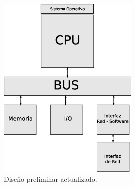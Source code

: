 \begin{figure}[H]
  \centering
	\includegraphics[width=0.60\textwidth]{2-sistema/graf/general2.eps}
  \caption{Diseño preliminar actualizado.}
  \label{fig:diseno2}
\end{figure}



